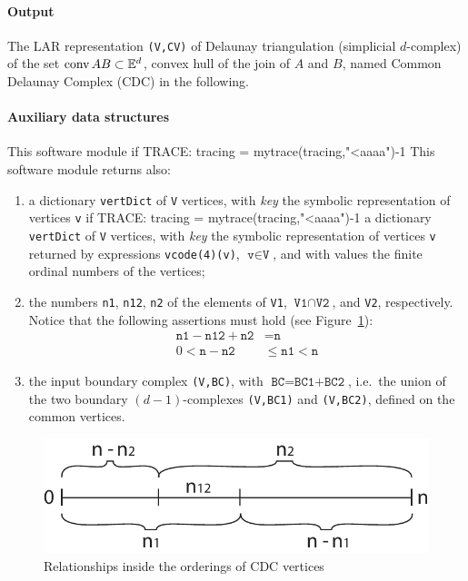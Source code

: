 \documentclass[11pt,oneside]{article}	%
\def\conv{\mbox{\textrm{conv}\,}}
\def\E{\mathbb{E}}
\def\conv{\mbox{\rm conv}\,}
\begin{document}
\paragraph{Output} 
The LAR representation \texttt{(V,CV)} of Delaunay triangulation (simplicial $d$-complex) of the set $\conv AB \subset \E^d$, convex hull of the join of $A$ and $B$, named Common Delaunay Complex (CDC) in the following.

\paragraph{Auxiliary data structures} 

This software module if TRACE: tracing = mytrace(tracing,"<aaaa")-1
This software module returns also:

\begin{enumerate}
\item 

a dictionary \texttt{vertDict} of \texttt{V} vertices, with \emph{key} the symbolic representation of vertices \texttt{v} if TRACE: tracing = mytrace(tracing,"<aaaa")-1
a dictionary \texttt{vertDict} of \texttt{V} vertices, with \emph{key} the symbolic representation of vertices \texttt{v} returned by expressions \texttt{vcode(4)(v)}, $\texttt{v}\in \texttt{V}$, and with values the finite ordinal numbers of the vertices;

\item 
the numbers \texttt{n1}, \texttt{n12}, \texttt{n2} of the elements of \texttt{V1}, $\texttt{V1}\cap\texttt{V2}$, and \texttt{V2}, respectively. Notice that the following assertions must hold (see Figure~\ref{fig:bounds}):
\begin{align}
\texttt{n1} - \texttt{n12} + \texttt{n2} &= \texttt{n} \\
0 < \texttt{n} - \texttt{n2}  &\leq  \texttt{n1}  <  \texttt{n} 
\end{align}

\item the input boundary complex \texttt{(V,BC)}, with $\texttt{BC} = \texttt{BC1+BC2}$, i.e.~the union of the  two boundary $(d-1)$-complexes \texttt{(V,BC1)} and \texttt{(V,BC2)}, defined on the common vertices.
\end{enumerate}

\begin{figure}[htbp] %
   \centering
   \includegraphics[width=0.5\linewidth]{images/bounds} 
   \caption{Relationships inside the orderings of CDC vertices}
   \label{fig:bounds}
\end{figure}
\end{document}
